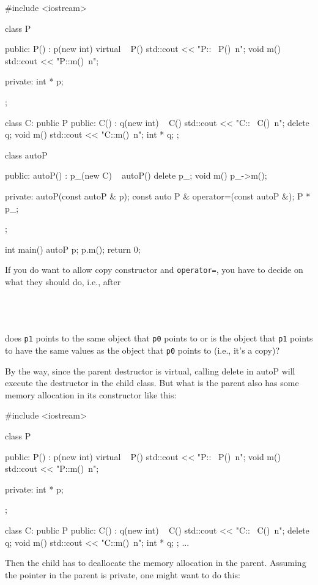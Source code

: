 \begin{console}
#include <iostream>

class P
{
public:
     P() : p(new int) {}
     virtual ~ P() { std::cout << "P::~ P()\ n"; }
     void m() { std::cout << "P::m()\ n"; }
     
private:
     int * p;
};

class C: public P
{
public:
     C() : q(new int) {}
     ~ C() { std::cout << "C::~ C()\ n"; delete q; }
     void m() { std::cout << "C::m()\ n"; }
     int * q;
};

class autoP
{
public:
     autoP()
         : p_(new C)
     {}
     ~ autoP()
     { delete p_; }
     void m() { p_->m(); }
     
private:
     autoP(const autoP & p);
     const auto P & operator=(const autoP &);
     P * p_;
};

int main()
{   
    autoP p;
    p.m();
    return 0;
}
\end{console}

If you do want to allow copy constructor and \texttt{operator=}, you have to decide on what they should do, i.e., after

\\
\\
\\

does \texttt{p1} points to the same object that \texttt{p0} points to or is the object that \texttt{p1} points to have the same values as the object that \texttt{p0} points to (i.e., it's a copy)?

By the way, since the parent destructor is virtual, calling delete in autoP will execute the destructor in the child class. But what is the parent also has some memory allocation in its constructor like this:

\begin{console}
#include <iostream>

class P
{
public:
     P() : p(new int) {}
     virtual ~ P() { std::cout << "P::~ P()\ n"; }
     void m() { std::cout << "P::m()\ n"; }

private:
     int * p;
};

class C: public P
{
public:
     C() : q(new int) {}
     ~ C() { std::cout << "C::~ C()\ n"; delete q; }
     void m() { std::cout << "C::m()\ n"; }
     int * q;
};
... 
\end{console}

Then the child has to deallocate the memory allocation in the parent.
Assuming the pointer in the parent is private, one might want to do
this:

